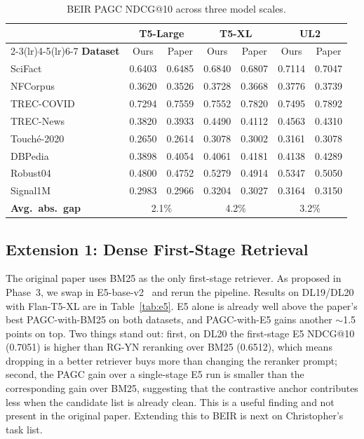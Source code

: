 \documentclass[conference]{IEEEtran}
\begin{document}
\begin{table}[h]
\centering
\scriptsize
\begin{tabular}{@{}lcccccc@{}}
\toprule
 & \multicolumn{2}{c}{\textbf{T5-Large}}
 & \multicolumn{2}{c}{\textbf{T5-XL}}
 & \multicolumn{2}{c}{\textbf{UL2}} \\
\cmidrule(lr){2-3}\cmidrule(lr){4-5}\cmidrule(lr){6-7}
\textbf{Dataset} & Ours & Paper & Ours & Paper & Ours & Paper \\
\midrule
SciFact       & 0.6403 & 0.6485 & 0.6840 & 0.6807 & 0.7114 & 0.7047 \\
NFCorpus      & 0.3620 & 0.3526 & 0.3728 & 0.3668 & 0.3776 & 0.3739 \\
TREC-COVID    & 0.7294 & 0.7559 & 0.7552 & 0.7820 & 0.7495 & 0.7892 \\
TREC-News     & 0.3820 & 0.3933 & 0.4490 & 0.4112 & 0.4563 & 0.4310 \\
Touch\'e-2020 & 0.2650 & 0.2614 & 0.3078 & 0.3002 & 0.3161 & 0.3078 \\
DBPedia       & 0.3898 & 0.4054 & 0.4061 & 0.4181 & 0.4138 & 0.4289 \\
Robust04      & 0.4800 & 0.4752 & 0.5279 & 0.4914 & 0.5347 & 0.5050 \\
Signal1M      & 0.2983 & 0.2966 & 0.3204 & 0.3027 & 0.3164 & 0.3150 \\
\midrule
\textbf{Avg.\ abs.\ gap}
 & \multicolumn{2}{c}{2.1\%}
 & \multicolumn{2}{c}{4.2\%}
 & \multicolumn{2}{c}{3.2\%} \\
\bottomrule
\end{tabular}
\caption{BEIR PAGC NDCG@10 across three model scales.}
\label{tab:beir}
\end{table}

\subsection{Extension 1: Dense First-Stage Retrieval}

The original paper uses BM25 as the only first-stage retriever. As proposed in Phase~3, we swap in E5-base-v2~\cite{wang2022e5} and rerun the pipeline. Results on DL19/DL20 with Flan-T5-XL are in Table~\ref{tab:e5}. E5 alone is already well above the paper's best PAGC-with-BM25 on both datasets, and PAGC-with-E5 gains another $\sim$1.5 points on top. Two things stand out: first, on DL20 the first-stage E5 NDCG@10 (0.7051) is higher than RG-YN reranking over BM25 (0.6512), which means dropping in a better retriever buys more than changing the reranker prompt; second, the PAGC gain over a single-stage E5 run is smaller than the corresponding gain over BM25, suggesting that the contrastive anchor contributes less when the candidate list is already clean. This is a useful finding and not present in the original paper. Extending this to BEIR is next on Christopher's task list.
\end{document}
